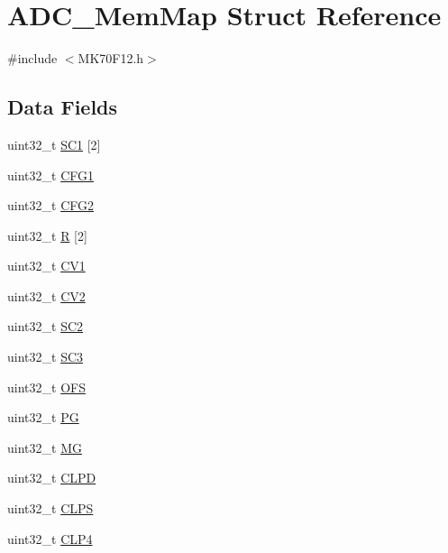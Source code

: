 \hypertarget{struct_a_d_c___mem_map}{}\section{A\+D\+C\+\_\+\+Mem\+Map Struct Reference}
\label{struct_a_d_c___mem_map}


{\ttfamily \#include $<$M\+K70\+F12.\+h$>$}

\subsection*{Data Fields}
\begin{DoxyCompactItemize}
\item 
uint32\+\_\+t \hyperlink{struct_a_d_c___mem_map_ab3900b4bfe889cd9d04850d121394741}{S\+C1} \mbox{[}2\mbox{]}
\item 
uint32\+\_\+t \hyperlink{struct_a_d_c___mem_map_a2320de82d9559e930bc71650b02993b7}{C\+F\+G1}
\item 
uint32\+\_\+t \hyperlink{struct_a_d_c___mem_map_aa39dedc8da290763fa121dc4c99dc5a4}{C\+F\+G2}
\item 
uint32\+\_\+t \hyperlink{struct_a_d_c___mem_map_acbd8ded0e3f30d8502e9b9229e092fe8}{R} \mbox{[}2\mbox{]}
\item 
uint32\+\_\+t \hyperlink{struct_a_d_c___mem_map_af687bec25a698b31731350c05cd5ba05}{C\+V1}
\item 
uint32\+\_\+t \hyperlink{struct_a_d_c___mem_map_acf6745fccc765451358e179f7131e645}{C\+V2}
\item 
uint32\+\_\+t \hyperlink{struct_a_d_c___mem_map_ad7caff2bf5e2dfb2159d174af24dc693}{S\+C2}
\item 
uint32\+\_\+t \hyperlink{struct_a_d_c___mem_map_a68295218c104f78bc2b11f04c06ce55e}{S\+C3}
\item 
uint32\+\_\+t \hyperlink{struct_a_d_c___mem_map_a89e51c569b4a0e4298bc4524afabb594}{O\+F\+S}
\item 
uint32\+\_\+t \hyperlink{struct_a_d_c___mem_map_aa63b6cd61d17dda7d69bdc02c7f5204a}{P\+G}
\item 
uint32\+\_\+t \hyperlink{struct_a_d_c___mem_map_ae615bad0b39c73a03fdebeb83f4beb91}{M\+G}
\item 
uint32\+\_\+t \hyperlink{struct_a_d_c___mem_map_a33d6e852c48cf68ba5b7db5f96e284f8}{C\+L\+P\+D}
\item 
uint32\+\_\+t \hyperlink{struct_a_d_c___mem_map_a6c8a55400c2b32d7018d37b23a6f3ec1}{C\+L\+P\+S}
\item 
uint32\+\_\+t \hyperlink{struct_a_d_c___mem_map_ac5abb63ee92fd5bef99367385b258b20}{C\+L\+P4}

\end{DoxyCompactItemize}
